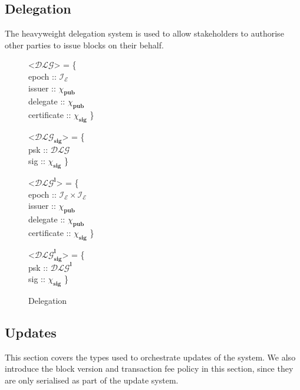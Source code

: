 \documentclass{article}
\def\fld{\\\llap{,\quad}}%
\newcommand{\idsof}[1]{\mathcal{I}\!_#1}
\newcommand{\epochids}{\idsof{\mathcal{E}}}
\newcommand{\pubkey}{\chi_{\textbf{pub}}}
\newcommand{\signature}{\chi_{\textbf{sig}}}
\newcommand{\dlg}{\mathcal{DLG}}
\newcommand{\dlglight}{\dlg^{\textbf{l}}}
\newcommand{\proxysig}{\dlg_{\textbf{sig}}}
\newcommand{\proxysiglight}{\dlg^{\textbf{l}}_{\textbf{sig}}}
\begin{document}
\subsection{Delegation}

The heavyweight delegation system is used to allow stakeholders to authorise
other parties to issue blocks on their behalf.

\begin{figure}[H]
  \begin{grammar}
    <$\dlg$> = \{
    \fld epoch :: $\epochids$
    \fld issuer :: $\pubkey$
    \fld delegate :: $\pubkey$
    \fld certificate :: $\signature$
    \}

    <$\proxysig$> = \{
    \fld psk :: $\dlg$
    \fld sig :: $\signature$
    \}

    <$\dlglight$> = \{
    \fld epoch :: $\epochids\times\epochids$
    \fld issuer :: $\pubkey$
    \fld delegate :: $\pubkey$
    \fld certificate :: $\signature$
    \}

    <$\proxysiglight$> = \{
    \fld psk :: $\dlglight$
    \fld sig :: $\signature$
    \}
  \end{grammar}
  \caption{Delegation}
  \label{fig:dlgtypes}
\end{figure}

\subsection{Updates}

This section covers the types used to orchestrate updates of the system. We also
introduce the block version and transaction fee policy in this section, since
they are only serialised as part of the update system.
\end{document}
